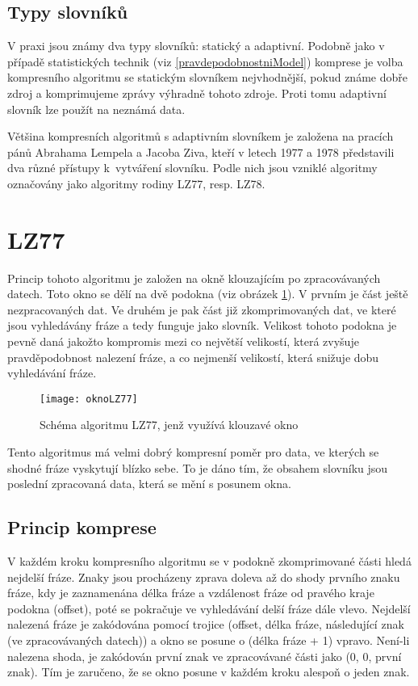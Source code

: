 \subsection{Typy slovníků}
V praxi jsou známy dva typy slovníků: statický a adaptivní. Podobně jako v případě statistických technik (viz \ref{pravdepodobnostniModel}) komprese je volba kompresního algoritmu se statickým slovníkem nejvhodnější, pokud známe dobře zdroj a komprimujeme zprávy výhradně tohoto zdroje. Proti tomu adaptivní slovník lze použít na neznámá data.

Většina kompresních algoritmů s adaptivním slovníkem je založena na pracích pánů Abrahama Lempela a Jacoba Ziva, kteří v letech 1977 a 1978 představili dva různé přístupy k~vytváření slovníku. Podle nich jsou vzniklé algoritmy označovány jako algoritmy rodiny LZ77, resp. LZ78.

\section{LZ77}
Princip tohoto algoritmu je založen na okně klouzajícím po zpracovávaných datech. Toto okno se dělí na dvě podokna (viz obrázek \ref{oknoLZ77}). V prvním je část ještě nezpracovaných dat. Ve druhém je pak část již zkomprimovaných dat, ve které jsou vyhledávány fráze a tedy funguje jako slovník. Velikost tohoto podokna je pevně daná jakožto kompromis mezi co největší velikostí, která zvyšuje pravděpodobnost nalezení fráze, a co nejmenší velikostí, která snižuje dobu vyhledávání fráze.

\begin{figure}[!htb]
\centering
\texttt{[image: oknoLZ77]}
\caption{Schéma algoritmu LZ77, jenž využívá klouzavé okno}
\label{oknoLZ77}
\end{figure}

Tento algoritmus má velmi dobrý kompresní poměr pro data, ve kterých se shodné fráze vyskytují blízko sebe. To je dáno tím, že obsahem slovníku jsou poslední zpracovaná data, která se mění s posunem okna.

\subsection{Princip komprese}
V každém kroku kompresního algoritmu se v podokně zkomprimované části hledá nejdelší fráze. Znaky jsou procházeny zprava doleva až do shody prvního znaku fráze, kdy je zaznamenána délka fráze a vzdálenost fráze od pravého kraje podokna (offset), poté se pokračuje ve vyhledávání delší fráze dále vlevo. Nejdelší nalezená fráze je zakódována pomocí trojice (offset, délka fráze, následující znak (ve zpracovávaných datech)) a okno se posune o (délka fráze + 1) vpravo. Není-li nalezena shoda, je zakódován první znak ve zpracovávané části jako (0, 0, první znak). Tím je zaručeno, že se okno posune v každém kroku alespoň o jeden znak.

